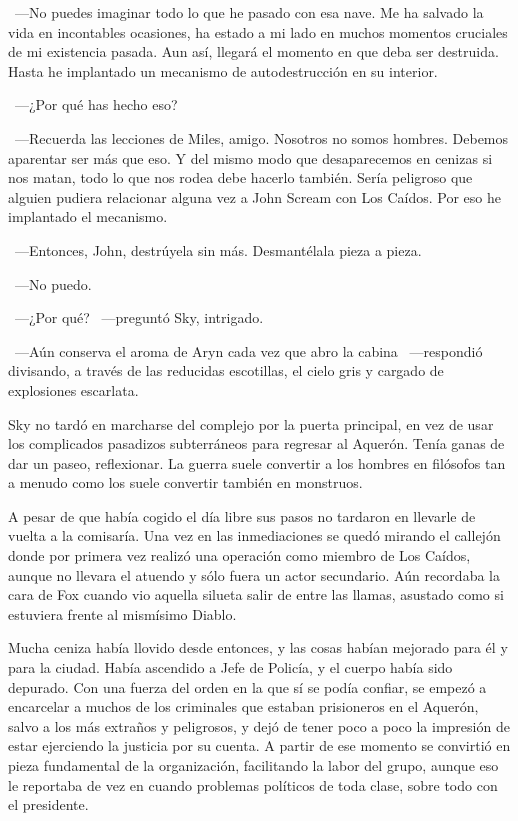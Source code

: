 ~---No puedes imaginar todo lo que he pasado con esa nave. Me ha salvado la vida en incontables ocasiones, ha estado a mi lado en muchos momentos cruciales de mi existencia pasada. Aun así, llegará el momento en que deba ser destruida. Hasta he implantado un mecanismo de autodestrucción en su interior.

~---¿Por qué has hecho eso?

~---Recuerda las lecciones de Miles, amigo. Nosotros no somos hombres. Debemos aparentar ser más que eso. Y del mismo modo que desaparecemos en cenizas si nos matan, todo lo que nos rodea debe hacerlo también. Sería peligroso que alguien pudiera relacionar alguna vez a John Scream con Los Caídos. Por eso he implantado el mecanismo.

~---Entonces, John, destrúyela sin más. Desmantélala pieza a pieza.

~---No puedo.

~---¿Por qué? ~---preguntó Sky, intrigado.

~---Aún conserva el aroma de Aryn cada vez que abro la cabina ~---respondió divisando, a través de las reducidas escotillas, el cielo gris y cargado de explosiones escarlata.

\bigskip\noindent
Sky no tardó en marcharse del complejo por la puerta principal, en vez de usar los complicados pasadizos subterráneos para regresar al Aquerón. Tenía ganas de dar un paseo, reflexionar. La guerra suele convertir a los hombres en filósofos tan a menudo como los suele convertir también en monstruos.

A pesar de que había cogido el día libre sus pasos no tardaron en llevarle de vuelta a la comisaría. Una vez en las inmediaciones se quedó mirando el callejón donde por primera vez realizó una operación como miembro de Los Caídos, aunque no llevara el atuendo y sólo fuera un actor secundario. Aún recordaba la cara de Fox cuando vio aquella silueta salir de entre las llamas, asustado como si estuviera frente al mismísimo Diablo.

Mucha ceniza había llovido desde entonces, y las cosas habían mejorado para él y para la ciudad. Había ascendido a Jefe de Policía, y el cuerpo había sido depurado. Con una fuerza del orden en la que sí se podía confiar, se empezó a encarcelar a muchos de los criminales que estaban prisioneros en el Aquerón, salvo a los más extraños y peligrosos, y dejó de tener poco a poco la impresión de estar ejerciendo la justicia por su cuenta. A partir de ese momento se convirtió en pieza fundamental de la organización, facilitando la labor del grupo, aunque eso le reportaba de vez en cuando problemas políticos de toda clase, sobre todo con el presidente.

